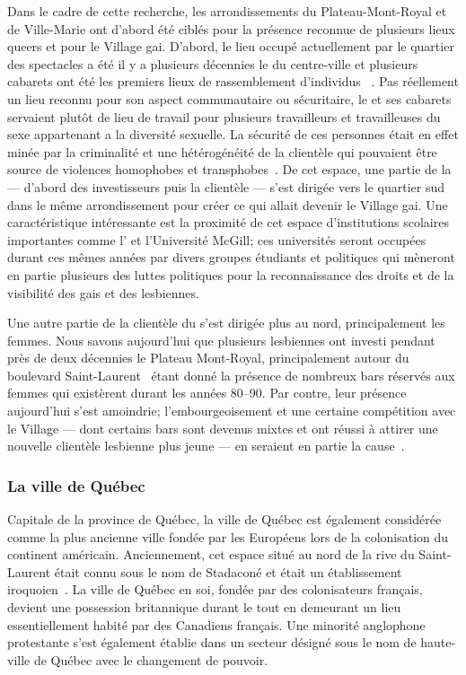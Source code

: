 Dans le cadre de cette recherche, les arrondissements du Plateau-Mont-Royal et de Ville-Marie ont d'abord été ciblés pour la présence reconnue de plusieurs lieux queers et pour le Village gai.
D'abord, le lieu occupé actuellement par le quartier des spectacles a été il y a plusieurs décennies le  du centre-ville et plusieurs cabarets ont été les premiers lieux de rassemblement d'individus \lgbt{}~\citep[198]{Podmore2015}.
Pas réellement un lieu reconnu pour son aspect  communautaire ou sécuritaire, le  et ses cabarets servaient plutôt de lieu de travail pour plusieurs travailleurs et travailleuses du sexe appartenant a la diversité sexuelle.
La sécurité de ces personnes était en effet minée par la criminalité et une hétérogénéité de la clientèle qui pouvaient être source de violences homophobes et transphobes~\parencite[91]{Higgins1999}.
De cet espace, une partie de la  --- d'abord des investisseurs puis la clientèle --- s'est dirigée vers le quartier sud dans le même arrondissement pour créer ce qui allait devenir le Village gai.
Une caractéristique intéressante est la proximité de cet espace d'institutions scolaires importantes comme l'\uqam{} et l'Université McGill; ces universités seront occupées durant ces mêmes années par divers groupes étudiants et politiques qui mèneront en partie plusieurs des luttes politiques pour la reconnaissance des droits et de la visibilité des gais et des lesbiennes.

Une autre partie de la clientèle \lgbt{} du  s'est dirigée plus au nord, principalement les femmes.
Nous savons aujourd'hui que plusieurs lesbiennes ont investi pendant près de deux décennies le Plateau Mont-Royal, principalement autour du boulevard Saint-Laurent~\citep[599]{Podmore2006} étant donné la présence de nombreux bars réservés aux femmes qui existèrent durant les années 80--90.
Par contre, leur présence aujourd'hui s'est amoindrie; l'embourgeoisement et une certaine compétition avec le Village --- dont certains bars sont devenus mixtes et ont réussi à attirer une nouvelle clientèle lesbienne plus jeune --- en seraient en partie la cause~\citep{Podmore2015}.

\subsubsection{La ville de Québec}
\label{ssub:la_ville_de_quebec}

Capitale de la province de Québec, la ville de Québec est également considérée comme la plus ancienne ville fondée par les Européens lors de la colonisation du continent américain.
Anciennement, cet espace situé au nord de la rive du Saint-Laurent était connu sous le nom de Stadaconé et était un établissement iroquoien~\citep[91]{Dickason1996}.
La ville de Québec en soi, fondée par des colonisateurs français, devient une possession britannique durant le  tout en demeurant un lieu essentiellement habité par des Canadiens français.
Une minorité anglophone protestante s'est également établie dans un secteur désigné sous le nom de haute-ville de Québec avec le changement de pouvoir\missref{}.


